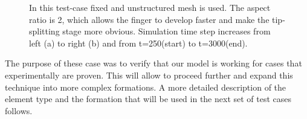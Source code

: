 \documentclass[preprint,authoryear,12pt]{elsarticle}
\begin{document}
\begin{figure}[h]
\begin{center}
\caption{In this test-case fixed and unstructured mesh is used. The aspect ratio is 2, which allows the finger to develop faster and make the tip-splitting stage more obvious. Simulation time step increases from left (a) to right (b) and from t=250(start) to t=3000(end).}
\label{fig:testcase}
\end{center}
\end{figure}

 The purpose of these case was to verify that our model is working for cases that experimentally are proven. This will allow to proceed further and expand this technique into more complex formations. A more detailed description of the element type and the formation that will be used in the next set of test cases follows.
\end{document}
